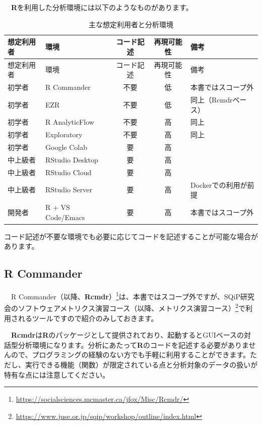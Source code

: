 \documentclass[
  12pt,
]{book}
\DeclareRobustCommand{\href}[2]{#2\footnote{\url{#1}}}
\begin{document}
　\textbf{R}を利用した分析環境には以下のようなものがあります。

\begin{longtable}[]{@{}llccl@{}}
\caption{主な想定利用者と分析環境}\tabularnewline
\toprule
想定利用者 & 環境 & コード記述 & 再現可能性 & 備考 \\
\midrule
\endfirsthead
\toprule
想定利用者 & 環境 & コード記述 & 再現可能性 & 備考 \\
\midrule
\endhead
初学者 & R Commander & 不要 & 低 & 本書ではスコープ外 \\
初学者 & EZR & 不要 & 低 & 同上（Rcmdrベース） \\
初学者 & R AnalyticFlow & 不要 & 高 & 同上 \\
初学者 & Exploratory & 不要 & 高 & 同上 \\
初学者 & Google Colab & 要 & 高 & \\
中上級者 & RStudio Desktop & 要 & 高 & \\
中上級者 & RStudio Cloud & 要 & 高 & \\
中上級者 & RStudio Server & 要 & 高 & Dockerでの利用が前提 \\
開発者 & R + VS Code/Emacs & 要 & 高 & 本書ではスコープ外 \\
\bottomrule
\end{longtable}

コード記述が不要な環境でも必要に応じてコードを記述することが可能な場合があります。

\newpage

\hypertarget{r-commander}{%
\subsection{\texorpdfstring{R Commander}{R Commander}}\label{r-commander}}

　\href{https://socialsciences.mcmaster.ca/jfox/Misc/Rcmdr/}{R Commander（以降、\textbf{Rcmdr}）}は、本書ではスコープ外ですが、\href{https://www.juse.or.jp/sqip/workshop/outline/index.html}{SQiP研究会のソフトウェアメトリクス演習コース（以降、メトリクス演習コース）}で利用されるツールですので紹介のみしておきます。

　\textbf{Rcmdr}は\textbf{R}のパッケージとして提供されており、起動するとGUIベースの対話型分析環境になります。分析にあたって\textbf{R}のコードを記述する必要がありませんので、プログラミングの経験のない方でも手軽に利用することができます。ただし、実行できる機能（関数）が限定されている点と分析対象のデータの扱いが特有な点には注意してください。
\end{document}
